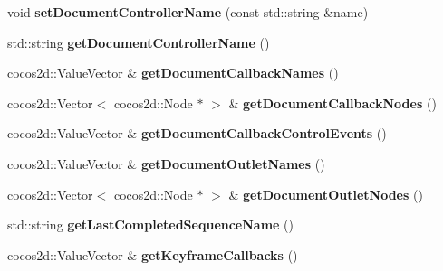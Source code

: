 \begin{DoxyCompactItemize}
void {\bfseries set\+Document\+Controller\+Name} (const std\+::string \&name)
\item 
\mbox{\label{classcocosbuilder_1_1CCBAnimationManager_aa189f63941484a46f1fc79f4ea2249df}} 
std\+::string {\bfseries get\+Document\+Controller\+Name} ()
\item 
\mbox{\label{classcocosbuilder_1_1CCBAnimationManager_ad7333a87283fc63eeffb67d042fe146d}} 
cocos2d\+::\+Value\+Vector \& {\bfseries get\+Document\+Callback\+Names} ()
\item 
\mbox{\label{classcocosbuilder_1_1CCBAnimationManager_a3e0417b779d9a71f62c418409e2ec16e}} 
cocos2d\+::\+Vector$<$ cocos2d\+::\+Node $\ast$ $>$ \& {\bfseries get\+Document\+Callback\+Nodes} ()
\item 
\mbox{\label{classcocosbuilder_1_1CCBAnimationManager_a5658007eac4959dcde9825c4d5b0a86f}} 
cocos2d\+::\+Value\+Vector \& {\bfseries get\+Document\+Callback\+Control\+Events} ()
\item 
\mbox{\label{classcocosbuilder_1_1CCBAnimationManager_a3ee8b3d9d89b6a812e9a5274dca6a25b}} 
cocos2d\+::\+Value\+Vector \& {\bfseries get\+Document\+Outlet\+Names} ()
\item 
\mbox{\label{classcocosbuilder_1_1CCBAnimationManager_a2d4912f49bda9f0ba7152a85e9f18779}} 
cocos2d\+::\+Vector$<$ cocos2d\+::\+Node $\ast$ $>$ \& {\bfseries get\+Document\+Outlet\+Nodes} ()
\item 
\mbox{\label{classcocosbuilder_1_1CCBAnimationManager_a9775dbda0d2aa42348e065d12e036bc9}} 
std\+::string {\bfseries get\+Last\+Completed\+Sequence\+Name} ()
\item 
\mbox{\label{classcocosbuilder_1_1CCBAnimationManager_a7c52e0a59b603c24fc7527ede9b1047e}} 
cocos2d\+::\+Value\+Vector \& {\bfseries get\+Keyframe\+Callbacks} ()
\item 
\mbox{\label{classcocosbuilder_1_1CCBAnimationManager_a75446dc4d81c8df587bb3c0523766f28}} 

\end{DoxyCompactItemize}
